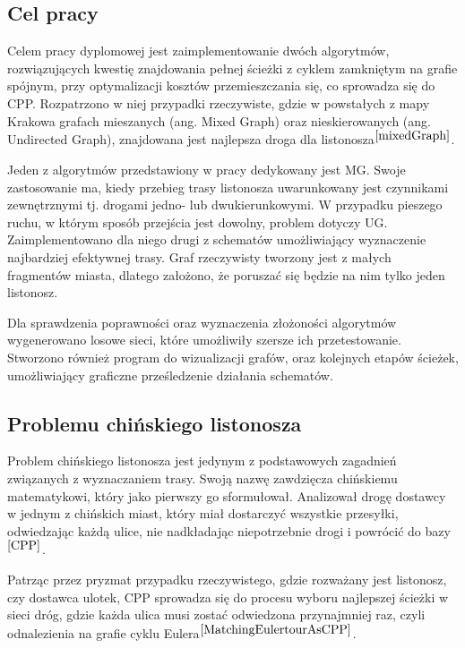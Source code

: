 \documentclass[a4paper, 12pt, twoside, openright]{article}
\begin{document}
\subsection{Cel pracy}
	\indent\par
	Celem pracy dyplomowej jest zaimplementowanie dwóch algorytmów, rozwiązujących kwestię znajdowania pełnej ścieżki z cyklem zamkniętym na grafie spójnym, przy optymalizacji kosztów przemieszczania się, co sprowadza się do CPP. 
	Rozpatrzono w niej przypadki rzeczywiste, gdzie w powstałych z mapy Krakowa grafach mieszanych (ang. Mixed Graph) oraz nieskierowanych (ang. Undirected Graph), znajdowana jest najlepsza droga dla listonosza$^{\cite{mixedGraph}}$.


	Jeden z algorytmów przedstawiony w pracy dedykowany jest MG. Swoje zastosowanie ma, kiedy przebieg trasy listonosza uwarunkowany jest czynnikami zewnętrznymi tj. drogami jedno- lub dwukierunkowymi. 
	W przypadku pieszego ruchu, w którym sposób przejścia jest  dowolny, problem dotyczy UG. Zaimplementowano dla niego drugi z schematów umożliwiający wyznaczenie najbardziej efektywnej trasy. Graf rzeczywisty tworzony jest z małych fragmentów miasta, dlatego założono, że poruszać się będzie na nim tylko jeden listonosz. 


	Dla sprawdzenia poprawności oraz wyznaczenia złożoności algorytmów wygenerowano losowe sieci, które umożliwiły szersze ich przetestowanie. 
	Stworzono również program do wizualizacji grafów, oraz kolejnych etapów ścieżek, umożliwiający graficzne prześledzenie działania schematów.




\subsection{Problemu chińskiego listonosza}
	\indent\par
	Problem chińskiego listonosza jest jedynym z podstawowych zagadnień związanych z wyznaczaniem trasy. Swoją nazwę zawdzięcza chińskiemu matematykowi, który jako pierwszy go sformułował. Analizował drogę dostawcy w jednym z chińskich miast, który miał dostarczyć wszystkie przesyłki, odwiedzając każdą ulice, nie nadkładając niepotrzebnie drogi i powrócić do bazy$^{{\cite{CPP}}}$. 
	
	Patrząc przez pryzmat przypadku rzeczywistego, gdzie rozważany jest listonosz, czy dostawca ulotek, CPP sprowadza się do procesu wyboru najlepszej ścieżki w sieci dróg, gdzie  każda ulica musi zostać odwiedzona przynajmniej raz, czyli odnalezienia na grafie cyklu Eulera$^{\cite{MatchingEulertourAsCPP}}$. 
\end{document}

